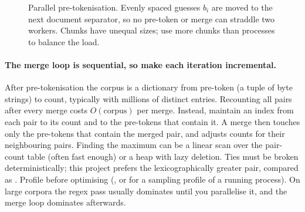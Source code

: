 \begin{figure}[t]
\centering
{}
\caption{Parallel pre-tokenisation. Evenly spaced guesses $b_i$ are moved to the next document
separator, so no pre-token or merge can straddle two workers. Chunks have unequal sizes; use more
chunks than processes to balance the load.}
\label{fig:proj1:chunks}
\end{figure}

\paragraph{The merge loop is sequential, so make each iteration incremental.} After
pre-tokenisation the corpus is a dictionary from pre-token (a tuple of byte strings) to count,
typically with millions of distinct entries. Recounting all pairs after every merge costs
$O(\text{corpus})$ per merge. Instead, maintain an index from each pair to its count and to the
pre-tokens that contain it. A merge then touches only the pre-tokens that contain the merged pair,
and adjusts counts for their neighbouring pairs. Finding the maximum can be a linear scan over the
pair-count table (often fast enough) or a heap with lazy deletion. Ties must be broken
deterministically; this project prefers the lexicographically greater pair, compared as
. Profile before optimising (, or  for a sampling
profile of a running process). On large corpora the regex pass usually dominates until you
parallelise it, and the merge loop dominates afterwards.

